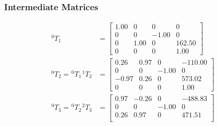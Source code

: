 \subsubsection{Intermediate Matrices}
\begin{equation*}
    \begin{split}
        ^{0}T_{1}                                                 & = \begin{bmatrix}
                                                                          1.00 & 0    & 0     & 0      \\
                                                                          0    & 0    & -1.00 & 0      \\
                                                                          0    & 1.00 & 0     & 162.50 \\
                                                                          0    & 0    & 0     & 1.00
                                                                      \end{bmatrix}    \\
        ^{0}T_{2} = \hspace{1pt} ^{0}T_{1} \hspace{1pt} ^{1}T_{2} & = \begin{bmatrix}
                                                                          0.26  & 0.97 & 0     & -110.00 \\
                                                                          0     & 0    & -1.00 & 0       \\
                                                                          -0.97 & 0.26 & 0     & 573.02  \\
                                                                          0     & 0    & 0     & 1.00
                                                                      \end{bmatrix}  \\
        ^{0}T_{3} = \hspace{1pt} ^{0}T_{2} \hspace{1pt} ^{2}T_{3} & = \begin{bmatrix}
                                                                          0.97 & -0.26 & 0     & -488.83 \\
                                                                          0    & 0     & -1.00 & 0       \\
                                                                          0.26 & 0.97  & 0     & 471.51  \\

\end{bmatrix}
\end{split}
\end{equation*}
